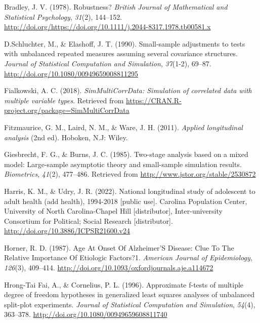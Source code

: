 \documentclass[12pt, twoside]{amherstthesis}
\begin{document}
\leavevmode\hypertarget{ref-bradley}{}%
Bradley, J. V. (1978). Robustness? \emph{British Journal of Mathematical and Statistical Psychology}, \emph{31}(2), 144--152. \url{http://doi.org/https://doi.org/10.1111/j.2044-8317.1978.tb00581.x}

\leavevmode\hypertarget{ref-Schluchte}{}%
D.Schluchter, M., \& Elashoff, J. T. (1990). Small-sample adjustments to tests with unbalanced repeated measures assuming several covariance structures. \emph{Journal of Statistical Computation and Simulation}, \emph{37}(1-2), 69--87. \url{http://doi.org/10.1080/00949659008811295}

\leavevmode\hypertarget{ref-Simtest}{}%
Fialkowski, A. C. (2018). \emph{SimMultiCorrData: Simulation of correlated data with multiple variable types}. Retrieved from \url{https://CRAN.R-project.org/package=SimMultiCorrData}

\leavevmode\hypertarget{ref-fitzmaurice_applied_2011}{}%
Fitzmaurice, G. M., Laird, N. M., \& Ware, J. H. (2011). \emph{Applied longitudinal analysis} (2nd ed). Hoboken, N.J: Wiley.

\leavevmode\hypertarget{ref-burns1985}{}%
Giesbrecht, F. G., \& Burns, J. C. (1985). Two-stage analysis based on a mixed model: Large-sample asymptotic theory and small-sample simulation results. \emph{Biometrics}, \emph{41}(2), 477--486. Retrieved from \url{http://www.jstor.org/stable/2530872}

\leavevmode\hypertarget{ref-harris_national_2022}{}%
Harris, K. M., \& Udry, J. R. (2022). National longitudinal study of adolescent to adult health (add health), 1994-2018 {[}public use{]}. Carolina Population Center, University of North Carolina-Chapel Hill {[}distributor{]}, Inter-university Consortium for Political; Social Research {[}distributor{]}. \url{http://doi.org/10.3886/ICPSR21600.v24}

\leavevmode\hypertarget{ref-horner_age_1987}{}%
Horner, R. D. (1987). Age At Onset Of Alzheimer'S Disease: Clue To The Relative Importance Of Etiologic Factors?1. \emph{American Journal of Epidemiology}, \emph{126}(3), 409--414. \url{http://doi.org/10.1093/oxfordjournals.aje.a114672}

\leavevmode\hypertarget{ref-hrong-tai_fai_approximate_1996}{}%
Hrong-Tai Fai, A., \& Cornelius, P. L. (1996). Approximate f-tests of multiple degree of freedom hypotheses in generalized least squares analyses of unbalanced split-plot experiments. \emph{Journal of Statistical Computation and Simulation}, \emph{54}(4), 363--378. \url{http://doi.org/10.1080/00949659608811740}
\end{document}
